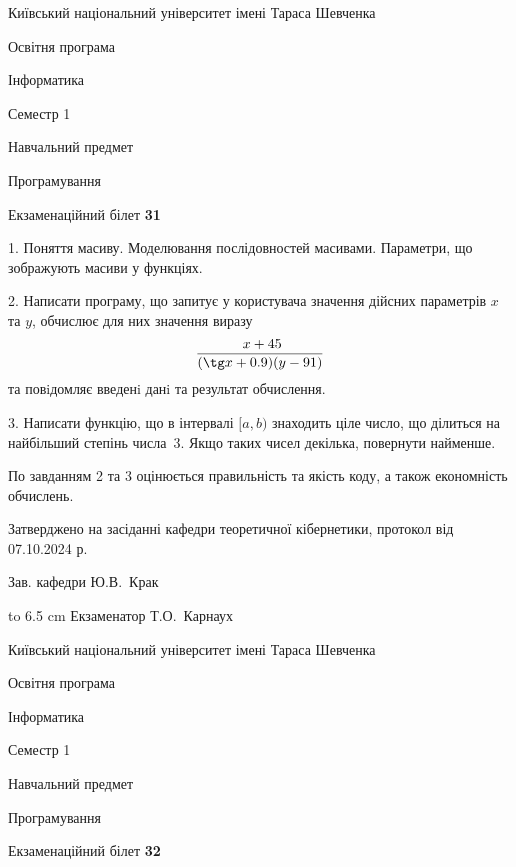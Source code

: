 \documentclass[12pt, ukrainian]{article}
\begin{document}
\newpage
{{\begin {scriptsize}\par
{ \center  Київський національний університет імені Тараса Шевченка \par}
{\parbox {5 cm}{Освітня програма \hfill}{\parbox {7 cm}{Інформатика\hfill}}\parbox {6 cm}{\hfill Семестр 1}}\par
{\parbox {5 cm} {Навчальний предмет \hfill}\parbox {7 cm}{Програмування \hfill}\parbox {6cm}{\hfill}\par}\vspace{-15pt} \end{scriptsize}}{\center Екзаменаційний білет \No \textbf { 31 }\par}}
{%
1. Поняття масиву. Моделювання послідовностей масивами. Параметри, що зображують масиви у функціях.%
\par
2. Написати програму, що запитує у користувача значення дійсних параметрів $x$ та $y$, обчислює для них значення виразу 
$$\frac{\ x + 45}{(\tg x + 0.9) (y - 91)}$$ 
та повiдомляє введенi данi та результат обчислення.

\par
3. Написати функцію, що в інтервалі $[a, b)$ знаходить ціле число, що ділиться на найбільший степінь числа 3. Якщо таких чисел декілька, повернути найменше.

По завданням 2 та 3 оцінюється правильність та якість коду, а також економність обчислень.

}
{\smallskip\smallskip \begin {scriptsize} Затверджено на засіданні кафедри теоретичної кібернетики, протокол   від   07.10.2024 р.\par\smallskip\smallskip\smallskip\smallskip
{\parbox {6.5 cm} {Зав. кафедри \dotfill Ю.В.~Крак}}\hspace {0.7cm} {\hbox to 6.5 cm { Екзаменатор \dotfill Т.О.~Карнаух}} \end{scriptsize}}
\vspace{0.9cm}
{{\begin {scriptsize}\par
{ \center  Київський національний університет імені Тараса Шевченка \par}
{\parbox {5 cm}{Освітня програма \hfill}{\parbox {7 cm}{Інформатика\hfill}}\parbox {6 cm}{\hfill Семестр 1}}\par
{\parbox {5 cm} {Навчальний предмет \hfill}\parbox {7 cm}{Програмування \hfill}\parbox {6cm}{\hfill}\par}\vspace{-15pt} \end{scriptsize}}{\center Екзаменаційний білет \No \textbf { 32 }\par}}
\end{document}
